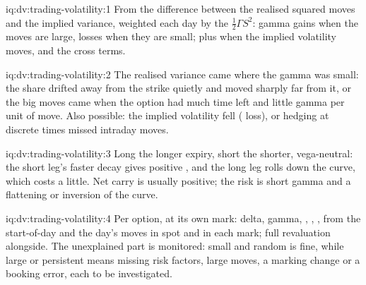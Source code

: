 \begin{solution}{iq:dv:trading-volatility:1}
From the difference between the realised squared moves and the implied variance, weighted each day by the  $\frac12\Gamma S^2$: gamma gains when the
moves are large,  losses when they are small; plus  when the implied volatility moves, and the cross terms.
\end{solution}

\begin{solution}{iq:dv:trading-volatility:2}
The realised variance came where the gamma was small: the share drifted away from the strike quietly and moved sharply far from it, or the big moves came when
the option had much time left and little gamma per unit of move. Also possible: the implied volatility fell ( loss), or hedging at discrete times missed
intraday moves.
\end{solution}

\begin{solution}{iq:dv:trading-volatility:3}
Long the longer expiry, short the shorter, vega-neutral: the short leg's faster decay gives positive , and the long leg rolls down the curve, which costs a
little. Net carry is usually positive; the risk is short gamma and a flattening or inversion of the curve.
\end{solution}

\begin{solution}{iq:dv:trading-volatility:4}
Per option, at its own mark: delta, gamma, , , ,  from the start-of-day  and the day's moves in spot and in each mark; full revaluation
alongside. The unexplained part is monitored: small and random is fine, while large or persistent means missing risk factors, large moves, a marking change or
a booking error, each to be investigated.
\end{solution}

